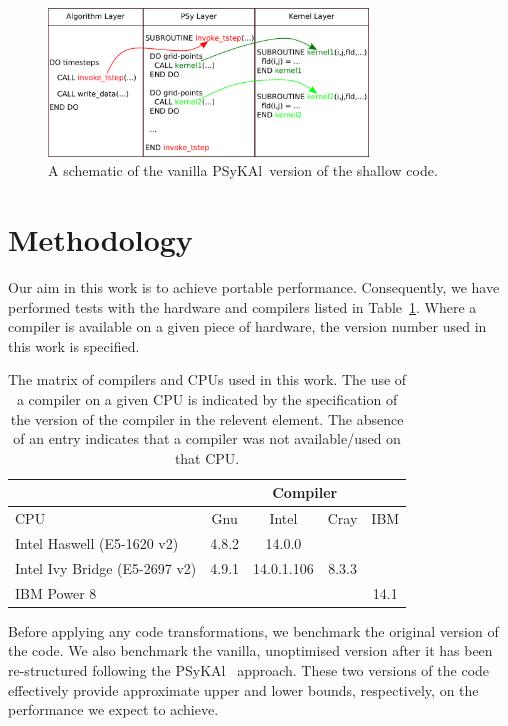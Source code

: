 \documentclass{IOS-Book-Article}
\newcommand{\psykal}{{PS}y{KA}l\ }
\begin{document}
\begin{figure}
\centering
\includegraphics[width=85mm]{../shallow_performance/psykal_shallow}
\caption{A schematic of the vanilla \psykal version of the shallow code.}
\label{FIG_psykal_shallow_structure}
\end{figure}

\section{Methodology}

Our aim in this work is to achieve portable performance. Consequently,
we have performed tests with the hardware and compilers listed in
Table~\ref{TABLE_compilers}. Where a compiler is available on a given
piece of hardware, the version number used in this work is specified.

\begin{table}[!t]
\renewcommand{\arraystretch}{1.3}
\caption{The matrix of compilers and CPUs used in this work. The use
  of a compiler on a given CPU is indicated by the specification of
  the version of the compiler in the relevent element. The absence of an entry
  indicates that a compiler was not available/used on that CPU.}
\label{TABLE_compilers}
\centering
\begin{tabular}{|l|c|c|c|c|}
\hline
                 & \multicolumn{4}{c|}{Compiler}             \\
\hline
       CPU       & Gnu   & Intel       & Cray    & IBM     \\
\hline
Intel Haswell (E5-1620 v2)   & 4.8.2 & 14.0.0      &         & \\
Intel Ivy Bridge  (E5-2697 v2) & 4.9.1 & 14.0.1.106  & 8.3.3 & \\
IBM Power 8      &       &             &             & 14.1    \\
\hline
\end{tabular}
\end{table}

Before applying any code transformations, we benchmark the original
version of the code. We also benchmark the vanilla, unoptimised
version after it has been re-structured following the \psykal
approach. These two versions of the code effectively provide
approximate upper and lower bounds, respectively, on the performance
we expect to achieve.
\end{document}
